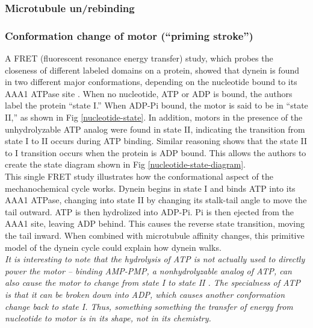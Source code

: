 \documentclass[10pt]{article} %
\begin{document}
\subsubsection{Microtubule un/rebinding}
\subsubsection{Conformation change of motor (``priming stroke'')}
A FRET (fluorescent resonance energy transfer) study, which probes the closeness of different labeled domains on a protein, showed that dynein is found in two different major conformations, depending on the nucleotide bound to its AAA1 ATPase site \cite{FRETstatepaper}. When no nucleotide, ATP or ADP is bound, the authors label the protein ``state I.'' When ADP-Pi bound, the motor is said to be in ``state II,'' as shown in Fig \ref{nucleotide-state}. In addition, motors in the presence of the unhydrolyzable ATP analog were found in state II, indicating the transition from state I to II occurs during ATP binding. Similar reasoning shows that the state II to I transition occurs when the protein is ADP bound. This allows the authors to create the state diagram shown in Fig \ref{nucleotide-state-diagram}.\\



This single FRET study illustrates how the conformational aspect of the mechanochemical cycle works. Dynein begins in state I and binds ATP into its AAA1 ATPase, changing into state II by changing its stalk-tail angle to move the tail outward. ATP is then hydrolized into ADP-Pi. Pi is then ejected from the AAA1 site, leaving ADP behind. This causes the reverse state transition, moving the tail inward. When combined with microtubule affinity changes, this primitive model of the dynein cycle could explain how dynein walks.\\

\textit{It is interesting to note that the hydrolysis of ATP is not actually used to directly power the motor -- binding AMP-PMP, a nonhydrolyzable analog of ATP, can also cause the motor to change from state I to state II \cite{FRETstatepaper}. The specialness of ATP is that it can be broken down into ADP, which causes another conformation change back to state I. Thus, something something the transfer of energy from nucleotide to motor is in its shape, not in its chemistry.}\\
\end{document}
